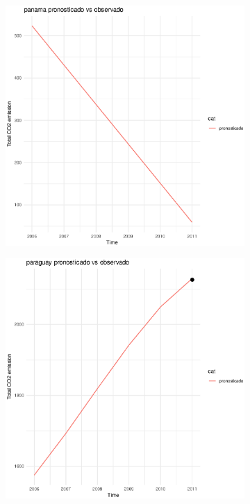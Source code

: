 \documentclass[twocolumn]{article}
\begin{document}
\begin{figure}
        \begin{subfigure}{.3\textwidth}
            \includegraphics[width=\linewidth]{images/panama_imputation.eps}
        \end{subfigure}
        \hspace*{\fill}
        \begin{subfigure}{.3\textwidth}
            \includegraphics[width=\linewidth]{images/paraguay_imputation.eps}

\end{subfigure}
\end{figure}
\end{document}
